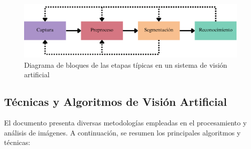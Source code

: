 \begin{figure}[H]
    \centering
    \includegraphics[width=0.8\linewidth]{Documento/Imagenes/Marco Teorico/Dig_blo_VA.pdf}
    \caption{Diagrama de bloques de las etapas típicas en un sistema de visión artificial\cite{visionporcomputador}}
    \label{fig:proceso_vision}
\end{figure}



\subsection{Técnicas y Algoritmos de Visión Artificial}

El documento \cite{visionArtificial2024} presenta diversas metodologías empleadas en el procesamiento y análisis de imágenes. A continuación, se resumen los principales algoritmos y técnicas:

